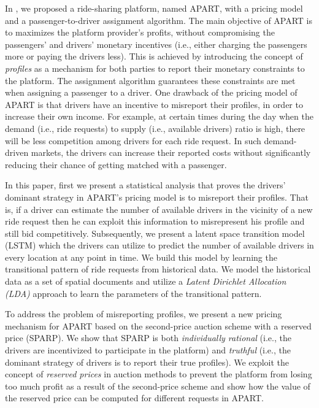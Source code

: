 In \cite{Asghari16}, we proposed a ride-sharing platform, named APART, with a pricing model and a passenger-to-driver assignment algorithm. The main objective of APART is to maximizes the platform provider's profits, without compromising the passengers' and drivers' monetary incentives (i.e., either charging the passengers more or paying the drivers less). This is achieved by introducing the concept of \emph{profiles} as a mechanism for both parties to report their monetary constraints to the platform. The assignment algorithm guarantees these constraints are met when assigning a passenger to a driver. One drawback of the pricing model of APART is that drivers have an incentive to misreport their profiles, in order to increase their own income. For example, at certain times during the day when the demand (i.e., ride requests) to supply (i.e., available drivers) ratio is high, there will be less competition among drivers for each ride request. In such demand-driven markets, the drivers can increase their reported costs without significantly reducing their chance of getting matched with a passenger.

In this paper, first we present a statistical analysis that proves the drivers' dominant strategy in APART's pricing model is to misreport their profiles. That is, if a driver can estimate the number of available drivers in the vicinity of a new ride request then he can exploit this information to misrepresent his profile and still bid competitively. Subsequently, we present a latent space transition model (LSTM) which the drivers can utilize to predict the number of available drivers in every location at any point in time. We build this model by learning the transitional pattern of ride requests from historical data. We model the historical data as a set of spatial documents and utilize a \emph{Latent Dirichlet Allocation (LDA)}\cite{Blei03} approach to learn the parameters of the transitional pattern.

To address the problem of misreporting profiles, we present a new pricing mechanism for APART based on the second-price auction scheme with a reserved price (SPARP). We show that SPARP is both \emph{individually rational} (i.e., the drivers are incentivized to participate in the platform) and \emph{truthful} (i.e., the dominant strategy of drivers is to report their true profiles). We exploit the concept of \emph{reserved prices} in auction methods to prevent the platform from losing too much profit as a result of the second-price scheme and show how the value of the reserved price can be computed for different requests in APART.

